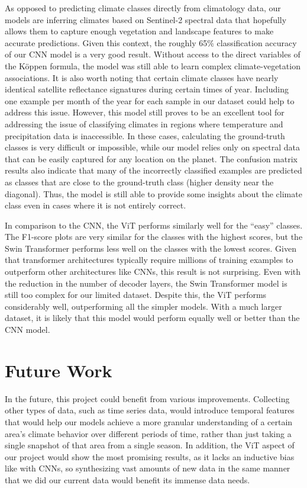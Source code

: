 \documentclass[12pt]{article}
\begin{document}
As opposed to predicting climate classes directly from climatology data, our models are inferring climates based on Sentinel-2 spectral data that hopefully allows them to capture enough vegetation and landscape features to make accurate predictions.
Given this context, the roughly 65\% classification accuracy of our CNN model is a very good result.
Without access to the direct variables of the Köppen formula, the model was still able to learn complex climate-vegetation associations.
It is also worth noting that certain climate classes have nearly identical satellite reflectance signatures during certain times of year.
Including one example per month of the year for each sample in our dataset could help to address this issue.
However, this model still proves to be an excellent tool for addressing the issue of classifying climates in regions where temperature and precipitation data is inaccessible.
In these cases, calculating the ground-truth classes is very difficult or impossible, while our model relies only on spectral data that can be easily captured for any location on the planet.
The confusion matrix results also indicate that many of the incorrectly classified examples are predicted as classes that are close to the ground-truth class (higher density near the diagonal).
Thus, the model is still able to provide some insights about the climate class even in cases where it is not entirely correct.

In comparison to the CNN, the ViT performs similarly well for the ``easy'' classes.
The F1-score plots are very similar for the classes with the highest scores, but the Swin Transformer performs less well on the classes with the lowest scores.
Given that transformer architectures typically require millions of training examples to outperform other architectures like CNNs, this result is not surprising.
Even with the reduction in the number of decoder layers, the Swin Transformer model is still too complex for our limited dataset.
Despite this, the ViT performs considerably well, outperforming all the simpler models.
With a much larger dataset, it is likely that this model would perform equally well or better than the CNN model.

\section{Future Work}
\label{sec:future-work}
In the future, this project could benefit from various improvements.
Collecting other types of data, such as time series data, would introduce temporal features that would help our models achieve a more granular understanding of a certain area's climate behavior over different periods of time, rather than just taking a single snapshot of that area from a single season.
In addition, the ViT aspect of our project would show the most promising results, as it lacks an inductive bias like with CNNs, so synthesizing vast amounts of new data in the same manner that we did our current data would benefit its immense data needs.

\printbibliography
\end{document}
